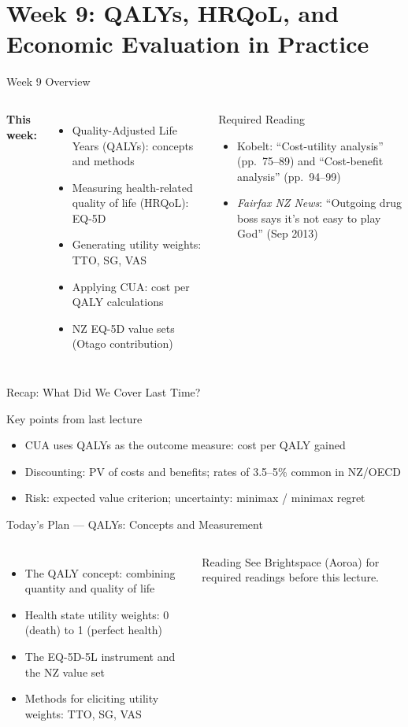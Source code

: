 \documentclass[aspectratio=169, 12pt]{beamer}
\newcommand{\recapslide}[1]{%
  \begin{frame}{Recap: What Did We Cover Last Time?}
    \begin{block}{Key points from last lecture}
      \begin{itemize}#1\end{itemize}
    \end{block}
  \end{frame}}
\newcommand{\planslide}[2]{%
  \begin{frame}{Today's Plan — #1}
    \begin{columns}
      \column{0.6\textwidth}
      \begin{itemize}#2\end{itemize}
      \column{0.38\textwidth}
      \begin{alertblock}{Reading}
        \footnotesize See Brightspace (Aoroa) for required readings before this lecture.
      \end{alertblock}
    \end{columns}
  \end{frame}}
\begin{document}
\section{Week 9: QALYs, HRQoL, and Economic Evaluation in Practice}

\begin{frame}{Week 9 Overview}
  \begin{columns}
      \textbf{This week:}
      \begin{itemize}
        \item Quality-Adjusted Life Years (QALYs): concepts and methods
        \item Measuring health-related quality of life (HRQoL): EQ-5D
        \item Generating utility weights: TTO, SG, VAS
        \item Applying CUA: cost per QALY calculations
        \item NZ EQ-5D value sets (Otago contribution)
      \end{itemize}
      \begin{block}{Required Reading}
        {\small
        \begin{itemize}
          \item Kobelt: ``Cost-utility analysis'' (pp.\ 75--89) and ``Cost-benefit analysis'' (pp.\ 94--99)
          \item \textit{Fairfax NZ News}: ``Outgoing drug boss says it's not easy to play God'' (Sep 2013)
        \end{itemize}}
      \end{block}
  \end{columns}
\end{frame}

\recapslide{
  \item CUA uses QALYs as the outcome measure: cost per QALY gained
  \item Discounting: PV of costs and benefits; rates of 3.5--5\% common in NZ/OECD
  \item Risk: expected value criterion; uncertainty: minimax / minimax regret
}

\planslide{QALYs: Concepts and Measurement}{
  \item The QALY concept: combining quantity and quality of life
  \item Health state utility weights: 0 (death) to 1 (perfect health)
  \item The EQ-5D-5L instrument and the NZ value set
  \item Methods for eliciting utility weights: TTO, SG, VAS
}
\end{document}

